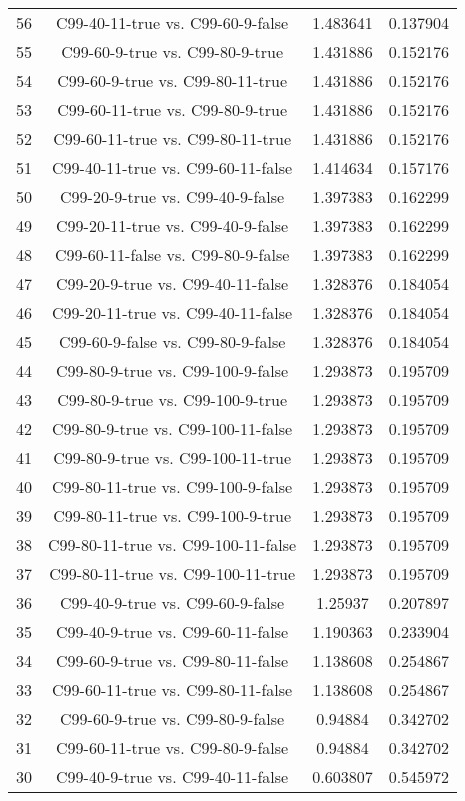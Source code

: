 \documentclass[a4paper,10pt]{article}
\begin{document}
\begin{landscape}
\begin{table}[!htp]
\begin{tabular}{cccc}
56&C99-40-11-true vs. C99-60-9-false&1.483641&0.137904\\
55&C99-60-9-true vs. C99-80-9-true&1.431886&0.152176\\
54&C99-60-9-true vs. C99-80-11-true&1.431886&0.152176\\
53&C99-60-11-true vs. C99-80-9-true&1.431886&0.152176\\
52&C99-60-11-true vs. C99-80-11-true&1.431886&0.152176\\
51&C99-40-11-true vs. C99-60-11-false&1.414634&0.157176\\
50&C99-20-9-true vs. C99-40-9-false&1.397383&0.162299\\
49&C99-20-11-true vs. C99-40-9-false&1.397383&0.162299\\
48&C99-60-11-false vs. C99-80-9-false&1.397383&0.162299\\
47&C99-20-9-true vs. C99-40-11-false&1.328376&0.184054\\
46&C99-20-11-true vs. C99-40-11-false&1.328376&0.184054\\
45&C99-60-9-false vs. C99-80-9-false&1.328376&0.184054\\
44&C99-80-9-true vs. C99-100-9-false&1.293873&0.195709\\
43&C99-80-9-true vs. C99-100-9-true&1.293873&0.195709\\
42&C99-80-9-true vs. C99-100-11-false&1.293873&0.195709\\
41&C99-80-9-true vs. C99-100-11-true&1.293873&0.195709\\
40&C99-80-11-true vs. C99-100-9-false&1.293873&0.195709\\
39&C99-80-11-true vs. C99-100-9-true&1.293873&0.195709\\
38&C99-80-11-true vs. C99-100-11-false&1.293873&0.195709\\
37&C99-80-11-true vs. C99-100-11-true&1.293873&0.195709\\
36&C99-40-9-true vs. C99-60-9-false&1.25937&0.207897\\
35&C99-40-9-true vs. C99-60-11-false&1.190363&0.233904\\
34&C99-60-9-true vs. C99-80-11-false&1.138608&0.254867\\
33&C99-60-11-true vs. C99-80-11-false&1.138608&0.254867\\
32&C99-60-9-true vs. C99-80-9-false&0.94884&0.342702\\
31&C99-60-11-true vs. C99-80-9-false&0.94884&0.342702\\
30&C99-40-9-true vs. C99-40-11-false&0.603807&0.545972\\

\end{tabular}
\end{table}
\end{landscape}
\end{document}
